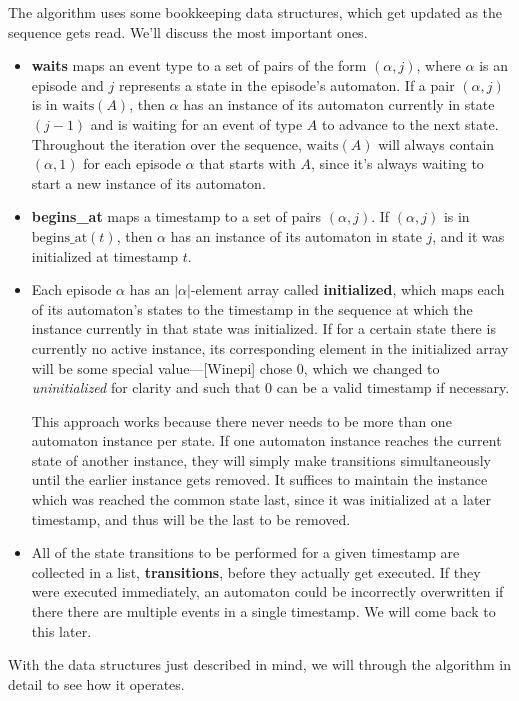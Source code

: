 The algorithm uses some bookkeeping data structures, which get updated as the sequence gets read. We'll discuss the most important ones.
\begin{itemize}
\item \textbf{waits} maps an event type to a set of pairs of the form $ (\alpha, j) $, where $ \alpha $ is an episode and $ j $ represents a state in the episode's automaton. If a pair $ (\alpha, j) $ is in $ \text{waits}(A) $, then $ \alpha $ has an instance of its automaton currently in state $ (j - 1) $ and is waiting for an event of type $ A $ to advance to the next state. Throughout the iteration over the sequence, $ \text{waits}(A) $ will always contain $ (\alpha, 1) $ for each episode $ \alpha $ that starts with $ A $, since it's always waiting to start a new instance of its automaton.
\item \textbf{begins\_at} maps a timestamp to a set of pairs $ (\alpha, j) $. If $ (\alpha, j) $ is in $ \text{begins\_at}(t) $, then $ \alpha $ has an instance of its automaton in state $ j $, and it was initialized at timestamp $ t $.
\item Each episode $ \alpha $ has an $ | \alpha | $-element array called \textbf{initialized}, which maps each of its automaton's states to the timestamp in the sequence at which the instance currently in that state was initialized. If for a certain state there is currently no active instance, its corresponding element in the initialized array will be some special value---[Winepi] chose 0, which we changed to \emph{uninitialized} for clarity and such that 0 can be a valid timestamp if necessary.

This approach works because there never needs to be more than one automaton instance per state. If one automaton instance reaches the current state of another instance, they will simply make transitions simultaneously until the earlier instance gets removed. It suffices to maintain the instance which was reached the common state last, since it was initialized at a later timestamp, and thus will be the last to be removed.
\item All of the state transitions to be performed for a given timestamp are collected in a list, \textbf{transitions}, before they actually get executed. If they were executed immediately, an automaton could be incorrectly overwritten if there there are multiple events in a single timestamp. We will come back to this later.
\end{itemize}

With the data structures just described in mind, we will through the algorithm in detail to see how it operates.

